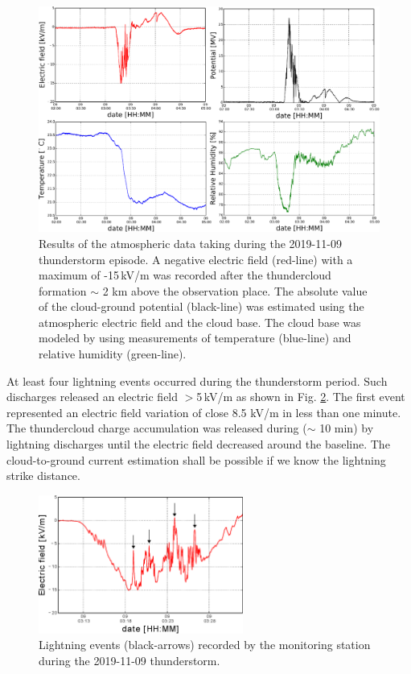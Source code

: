 \documentclass[letterpaper,12pt]{article}
\begin{document}
\begin{figure}[h!]
\begin{center}
\includegraphics[width=1\textwidth]{Figures/Event.eps}
\caption{Results of the atmospheric data taking during the 2019-11-09 thunderstorm episode. A negative electric field (red-line) with a maximum of -15\,kV/m was recorded after the thundercloud formation $\sim$ 2 km above the observation place. The absolute value of the cloud-ground potential (black-line) was estimated using the atmospheric electric field and the cloud base. The cloud base was modeled by using measurements of temperature (blue-line) and relative humidity (green-line).}
\label{fig::event}
\end{center}
\end{figure}

At least four lightning events occurred during the thunderstorm period. Such discharges released an electric field $>$5\,kV/m as shown in Fig. \ref{fig::light}. The first event represented an electric field variation of close 8.5 kV/m in less than one minute. The thundercloud charge accumulation was released during ($\sim$ 10 min) by lightning discharges until the electric field decreased around the baseline. The cloud-to-ground current estimation shall be possible if we know the lightning strike distance.

\begin{figure}[h]
\begin{center}
\includegraphics[width=0.6\textwidth]{Figures/lightning.eps}
\caption{Lightning events (black-arrows) recorded by the monitoring station during the 2019-11-09 thunderstorm. }
\label{fig::light}
\end{center}
\end{figure}
 
\end{document}
